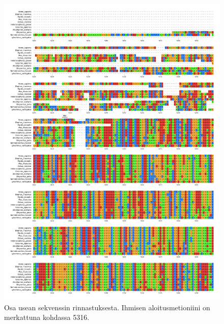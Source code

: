 \documentclass[a4paper,11pt,notitlepage]{article}
\begin{document}
\begin{appendices}
\begin{figure}[!h]
	\centering
	\includegraphics[width=\textwidth]{msa.png}
	\caption{Osa usean sekvenssin rinnastuksesta. Ihmisen aloitusmetioniini on merkattuna kohdassa 5316.} \label{msa}
\end{figure}

\end{appendices}
\end{document}
